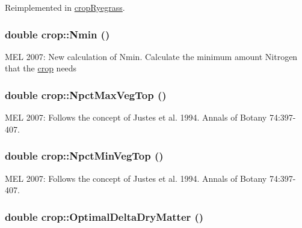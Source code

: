 Reimplemented in \hyperlink{classcrop_ryegrass_aac89498ebd762c28e8bed76ec7c78db0}{cropRyegrass}.\hypertarget{classcrop_adc9f2a384dfd4be26746b822c4324f37}{
\subsubsection[{Nmin}]{\setlength{\rightskip}{0pt plus 5cm}double crop::Nmin ()}}
\label{classcrop_adc9f2a384dfd4be26746b822c4324f37}
MEL 2007: New calculation of Nmin. Calculate the minimum amount Nitrogen that the \hyperlink{classcrop}{crop} needs \hypertarget{classcrop_a32e4925865c2310ccc9efc0df1cec1bb}{
\subsubsection[{NpctMaxVegTop}]{\setlength{\rightskip}{0pt plus 5cm}double crop::NpctMaxVegTop ()}}
\label{classcrop_a32e4925865c2310ccc9efc0df1cec1bb}
MEL 2007: Follows the concept of Justes et al. 1994. Annals of Botany 74:397-\/407. \hypertarget{classcrop_a10c59f3f5b94ba41a4678e68d6e559b2}{
\subsubsection[{NpctMinVegTop}]{\setlength{\rightskip}{0pt plus 5cm}double crop::NpctMinVegTop ()}}
\label{classcrop_a10c59f3f5b94ba41a4678e68d6e559b2}
MEL 2007: Follows the concept of Justes et al. 1994. Annals of Botany 74:397-\/407. \hypertarget{classcrop_a453298213a2fe4470677235a81e6d62a}{
\subsubsection[{OptimalDeltaDryMatter}]{\setlength{\rightskip}{0pt plus 5cm}double crop::OptimalDeltaDryMatter ()}}
